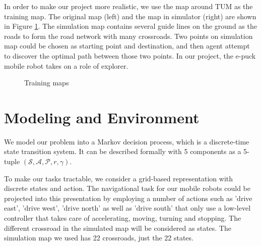 \documentclass[a4paper, 11pt]{article} %
\begin{document}
In order to make our project more realistic, we use the map around TUM as the
training map.
The original map (left) and the map in simulator (right) are shown
in Figure \ref{fig1}. The simulation map contains several guide lines on the
ground as the roads to form the road network with many crossroads. Two points on
simulation map could be chosen as starting point and destination, and then agent
attempt to discover the optimal path between those two points. In our project,
the e-puck mobile robot takes on a role of explorer.
\begin{figure}[tbp]
\centering
{}
\caption{Training maps}
\label{fig1}
\end{figure}


\section{Modeling and Environment}
We model our problem into a Markov decision process, which is a discrete-time state transition system. It can be described formally with 5 components as a 5-tuple $(\mathcal{S,A,P}, r,\gamma)$.

To make our tasks tractable, we consider a grid-based representation with discrete
states and action. The navigational task for our mobile robots could be projected
into this presentation by employing a number of actions such as 'drive east',
'drive west', 'drive north' as well as 'drive south' that only use a low-level
controller that takes care of accelerating, moving, turning and stopping. The
different crossroad in the simulated map will be considered as states. The simulation
map we used has 22 crossroads, just the 22 states.
\end{document}
